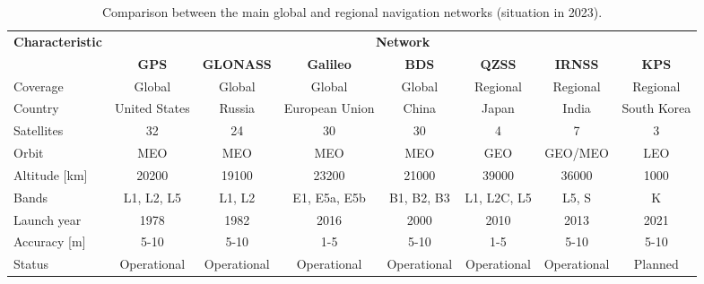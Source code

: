 \begin{landscape}

\begin{table}[!ht]
    \centering
    \begin{tabular}{lccccccc}
        \toprule[1.5pt]
        \multirow{2}{*}{\textbf{Characteristic}} & \multicolumn{7}{c}{\textbf{Network}} \\
                                                 & \textbf{GPS} & \textbf{GLONASS} & \textbf{Galileo} & \textbf{BDS} & \textbf{QZSS} & \textbf{IRNSS} & \textbf{KPS} \\
        \midrule
        Coverage      & Global        & Global      & Global         & Global      & Regional    & Regional    & Regional \\
        Country       & United States & Russia      & European Union & China       & Japan       & India       & South Korea\\
        Satellites    & 32            & 24          & 30             & 30          & 4           & 7           & 3 \\
        Orbit         & MEO           & MEO         & MEO            & MEO         & GEO         & GEO/MEO     & LEO \\
        Altitude [km] & 20200         & 19100       & 23200          & 21000       & 39000       & 36000       & 1000 \\
        Bands         & L1, L2, L5    & L1, L2      & E1, E5a, E5b   & B1, B2, B3  & L1, L2C, L5 & L5, S       & K \\
        Launch year   & 1978          & 1982        & 2016           & 2000        & 2010        & 2013        & 2021 \\
        Accuracy [m]  & 5-10          & 5-10        & 1-5            & 5-10        & 1-5         & 5-10        & 5-10 \\
        Status        & Operational   & Operational & Operational    & Operational & Operational & Operational & Planned \\
        \bottomrule[1.5pt]
    \end{tabular}
    \caption{Comparison between the main global and regional navigation networks (situation in 2023).}
    \label{tab:networks-comparison}
\end{table}

\end{landscape}

